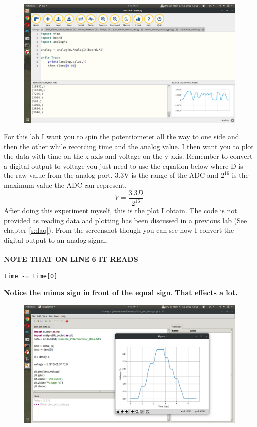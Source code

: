 \begin{figure}[H]
  \begin{center}
    \includegraphics[width=\textwidth]{Figures/analogio_mu.png}
  \end{center}
\end{figure}
For this lab I want you to spin the potentiometer all the way to one side and then the other while recording time and the analog value. I then want you to plot the data with time on the x-axis and voltage on the y-axis. Remember to convert a digital output to voltage you just need to use the equation below where D is the raw value from the analog port. 3.3V is the range of the ADC and $2^{16}$ is the maximum value the ADC can represent.
\begin{equation}
V = \frac{3.3D}{2^{16}}
\end{equation}
After doing this experiment myself, this is the plot I obtain. The code is not provided as reading data and plotting has been discussed in a previous lab (See chapter \ref{s:daq}). From the screenshot though you can see how I convert the digital output to an analog signal.
\ \\
\ \\
{\bf NOTE THAT ON LINE 6 IT READS}
\begin{verbatim}
time -= time[0]
\end{verbatim}
{\bf Notice the minus sign in front of the equal sign. That effects a lot.}
\begin{figure}[H]
  \begin{center}
    \includegraphics[width=\textwidth]{Figures/plotting_analogio.png}
  \end{center}
\end{figure}
